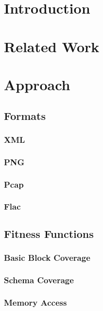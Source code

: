 \documentclass[a4paper]{scrartcl}
\begin{document}

\newpage

\newpage

\newpage

\newpage
\tableofcontents
\newpage
\section{Introduction}
\section{Related Work}
\section{Approach}



\subsection{Formats}
\subsubsection{XML}
\subsubsection{PNG}
\subsubsection{Pcap}
\subsubsection{Flac}
\subsection{Fitness Functions}
\subsubsection{Basic Block Coverage}
\subsubsection{Schema Coverage}
\subsubsection{Memory Access}
\end{document}
